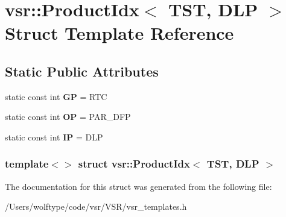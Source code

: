 \hypertarget{structvsr_1_1_product_idx_3_01_t_s_t_00_01_d_l_p_01_4}{\section{vsr\-:\-:Product\-Idx$<$ T\-S\-T, D\-L\-P $>$ Struct Template Reference}
\label{structvsr_1_1_product_idx_3_01_t_s_t_00_01_d_l_p_01_4}
}
\subsection*{Static Public Attributes}
\begin{DoxyCompactItemize}
\item 
\hypertarget{structvsr_1_1_product_idx_3_01_t_s_t_00_01_d_l_p_01_4_a8c7f3ebd6f70fe2ac76740309c3beb10}{static const int {\bfseries G\-P} = R\-T\-C}\label{structvsr_1_1_product_idx_3_01_t_s_t_00_01_d_l_p_01_4_a8c7f3ebd6f70fe2ac76740309c3beb10}

\item 
\hypertarget{structvsr_1_1_product_idx_3_01_t_s_t_00_01_d_l_p_01_4_aeb496149c63abd9517c6488229b4b82a}{static const int {\bfseries O\-P} = P\-A\-R\-\_\-\-D\-F\-P}\label{structvsr_1_1_product_idx_3_01_t_s_t_00_01_d_l_p_01_4_aeb496149c63abd9517c6488229b4b82a}

\item 
\hypertarget{structvsr_1_1_product_idx_3_01_t_s_t_00_01_d_l_p_01_4_a2609932477dd3d2a6dc771c0f76b9194}{static const int {\bfseries I\-P} = D\-L\-P}\label{structvsr_1_1_product_idx_3_01_t_s_t_00_01_d_l_p_01_4_a2609932477dd3d2a6dc771c0f76b9194}

\end{DoxyCompactItemize}
\subsubsection*{template$<$$>$ struct vsr\-::\-Product\-Idx$<$ T\-S\-T, D\-L\-P $>$}



The documentation for this struct was generated from the following file\-:\begin{DoxyCompactItemize}
\item 
/\-Users/wolftype/code/vsr/\-V\-S\-R/vsr\-\_\-templates.\-h\end{DoxyCompactItemize}
